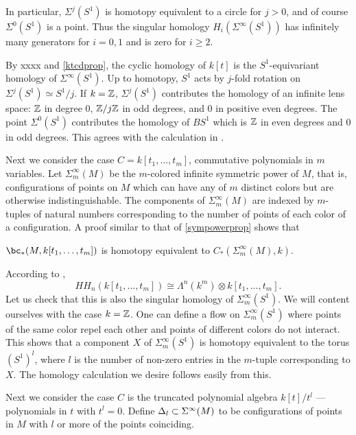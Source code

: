 In particular, $\Sigma^j(S^1)$ is homotopy equivalent to a circle for $j>0$, and
of course $\Sigma^0(S^1)$ is a point.
Thus the singular homology $H_i(\Sigma^\infty(S^1))$ has infinitely many generators for $i=0,1$
and is zero for $i\ge 2$.

By xxxx and \ref{ktcdprop}, 
the cyclic homology of $k[t]$ is the $S^1$-equivariant homology of $\Sigma^\infty(S^1)$.
Up to homotopy, $S^1$ acts by $j$-fold rotation on $\Sigma^j(S^1) \simeq S^1/j$.
If $k = \mathbb{Z}$, $\Sigma^j(S^1)$ contributes the homology of an infinite lens space: $\mathbb{Z}$ in degree
0, $\mathbb{Z}/j \mathbb{Z}$ in odd degrees, and 0 in positive even degrees.
The point $\Sigma^0(S^1)$ contributes the homology of $BS^1$ which is $\mathbb{Z}$ in even 
degrees and 0 in odd degrees.
This agrees with the calculation in \cite[3.1.7]{MR1600246}.

\medskip

Next we consider the case $C = k[t_1, \ldots, t_m]$, commutative polynomials in $m$ variables.
Let $\Sigma_m^\infty(M)$ be the $m$-colored infinite symmetric power of $M$, that is, configurations
of points on $M$ which can have any of $m$ distinct colors but are otherwise indistinguishable.
The components of $\Sigma_m^\infty(M)$ are indexed by $m$-tuples of natural numbers
corresponding to the number of points of each color of a configuration.
A proof similar to that of \ref{sympowerprop} shows that

\begin{prop}
$\bc_*(M, k[t_1, \ldots, t_m])$ is homotopy equivalent to $C_*(\Sigma_m^\infty(M), k)$.
\end{prop}

According to \cite[3.2.2]{MR1600246},
\[
	HH_n(k[t_1, \ldots, t_m]) \cong \Lambda^n(k^m) \otimes k[t_1, \ldots, t_m] .
\]
Let us check that this is also the singular homology of $\Sigma_m^\infty(S^1)$.
We will content ourselves with the case $k = \mathbb{Z}$.
One can define a flow on $\Sigma_m^\infty(S^1)$ where points of the same color repel each other and points of different colors do not interact.
This shows that a component $X$ of $\Sigma_m^\infty(S^1)$ is homotopy equivalent
to the torus $(S^1)^l$, where $l$ is the number of non-zero entries in the $m$-tuple
corresponding to $X$.
The homology calculation we desire follows easily from this.


\medskip

Next we consider the case $C$ is the truncated polynomial
algebra $k[t]/t^l$ --- polynomials in $t$ with $t^l = 0$.
Define $\Delta_l \subset \Sigma^\infty(M)$ to be configurations of points in $M$ with $l$ or
more of the points coinciding.

